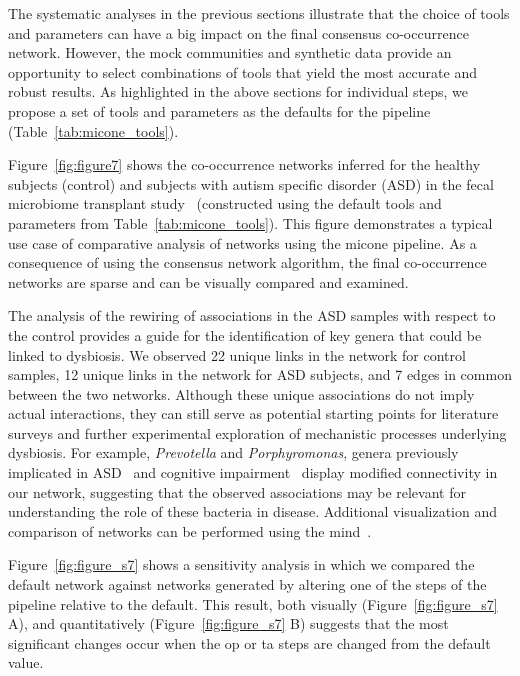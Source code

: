 \documentclass[letterpaper,12pt]{article}
\begin{document}
  The systematic analyses in the previous sections illustrate that the choice of tools and parameters can have a big impact on the final consensus co-occurrence network.
  However, the mock communities and synthetic data provide an opportunity to select combinations of tools that yield the most accurate and robust results.
  As highlighted in the above sections for individual steps, we propose a set of tools and parameters as the defaults for the pipeline (Table~\ref{tab:micone_tools}).

  Figure~\ref{fig:figure7} shows the co-occurrence networks inferred for the healthy subjects (control) and subjects with autism specific disorder (ASD) in the fecal microbiome transplant study~\cite{Kang2017} (constructed using the default tools and parameters from Table~\ref{tab:micone_tools}).
  This figure demonstrates a typical use case of comparative analysis of networks using the \ac{micone} pipeline.
  As a consequence of using the consensus network algorithm, the final co-occurrence networks are sparse and can be visually compared and examined.

  The analysis of the rewiring of associations in the ASD samples with respect to the control provides a guide for the identification of key genera that could be linked to dysbiosis.
  We observed 22 unique links in the network for control samples, 12 unique links in the network for ASD subjects, and 7 edges in common between the two networks.
  Although these unique associations do not imply actual interactions, they can still serve as potential starting points for literature surveys and further experimental exploration of mechanistic processes underlying dysbiosis.
  For example, \textit{Prevotella} and \textit{Porphyromonas}, genera previously implicated in ASD~\cite{Kang2017,hoGutMicrobiotaChanges2020} and cognitive impairment~\cite{chiPorphyromonasGingivalisInducedCognitive2021} display modified connectivity in our network, suggesting that the observed associations may be relevant for understanding the role of these bacteria in disease.
  Additional visualization and comparison of networks can be performed using the \acf{mind}~\cite{huResourceComparisonIntegration2022}.

  Figure~\ref{fig:figure_s7} shows a sensitivity analysis in which we compared the default network against networks generated by altering one of the steps of the pipeline relative to the default.
  This result, both visually (Figure~\ref{fig:figure_s7} A), and quantitatively (Figure~\ref{fig:figure_s7} B)  suggests that the most significant changes occur when the \ac{op} or \ac{ta} steps are changed from the default value.
\end{document}
